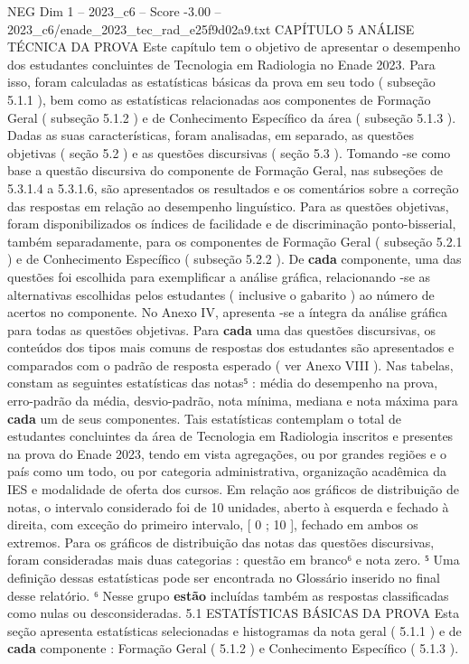 \begin{textsample}{NEG Dim 1 – 2023\_c6 – Score -3.00 – 2023\_c6/enade\_2023\_tec\_rad\_e25f9d02a9.txt}  \label{ex:f1_neg_210}
CAPÍTULO 5 ANÁLISE TÉCNICA DA PROVA Este capítulo tem o objetivo de apresentar o desempenho dos estudantes concluintes de Tecnologia em Radiologia no Enade 2023.
Para isso, foram calculadas as estatísticas básicas da prova em seu todo ( subseção 5.1.1 ), bem como as estatísticas relacionadas aos componentes de Formação Geral ( subseção 5.1.2 ) e de Conhecimento Específico da área ( subseção 5.1.3 ).
Dadas as suas características, foram analisadas, em separado, as questões objetivas ( seção 5.2 ) e as questões discursivas ( seção 5.3 ).
Tomando -se como base a questão discursiva do componente de Formação Geral, nas subseções de 5.3.1.4 a 5.3.1.6, são apresentados os resultados e os comentários sobre a correção das respostas em relação ao desempenho linguístico.
Para as questões objetivas, foram disponibilizados os índices de facilidade e de discriminação ponto-bisserial, também separadamente, para os componentes de Formação Geral ( subseção 5.2.1 ) e de Conhecimento Específico ( subseção 5.2.2 ).
De \textbf{cada} componente, uma das questões foi escolhida para exemplificar a análise gráfica, relacionando -se as alternativas escolhidas pelos estudantes ( inclusive o gabarito ) ao número de acertos no componente.
No Anexo IV, apresenta -se a íntegra da análise gráfica para todas as questões objetivas.
Para \textbf{cada} uma das questões discursivas, os conteúdos dos tipos mais comuns de respostas dos estudantes são apresentados e comparados com o padrão de resposta esperado ( ver Anexo VIII ).
Nas tabelas, constam as seguintes estatísticas das notas⁵ : média do desempenho na prova, erro-padrão da média, desvio-padrão, nota mínima, mediana e nota máxima para \textbf{cada} um de seus componentes.
Tais estatísticas contemplam o total de estudantes concluintes da área de Tecnologia em Radiologia inscritos e presentes na prova do Enade 2023, tendo em vista agregações, ou por grandes regiões e o país como um todo, ou por categoria administrativa, organização acadêmica da IES e modalidade de oferta dos cursos.
Em relação aos gráficos de distribuição de notas, o intervalo considerado foi de 10 unidades, aberto à esquerda e fechado à direita, com exceção do primeiro intervalo, [ 0 ; 10 ], fechado em ambos os extremos.
Para os gráficos de distribuição das notas das questões discursivas, foram consideradas mais duas categorias : questão em branco⁶ e nota zero. ⁵ Uma definição dessas estatísticas pode ser encontrada no Glossário inserido no final desse relatório. ⁶ Nesse grupo \textbf{estão} incluídas também as respostas classificadas como nulas ou desconsideradas. 5.1 ESTATÍSTICAS BÁSICAS DA PROVA Esta seção apresenta estatísticas selecionadas e histogramas da nota geral ( 5.1.1 ) e de \textbf{cada} componente : Formação Geral ( 5.1.2 ) e Conhecimento Específico ( 5.1.3 ).

\end{textsample}
